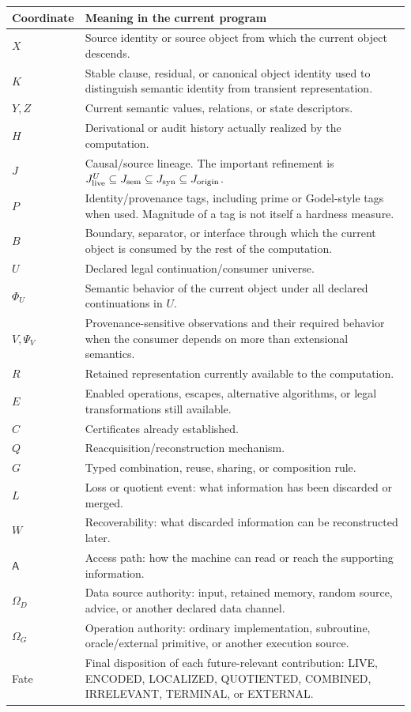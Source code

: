 \documentclass[11pt]{article}
\theoremstyle{plain}
\theoremstyle{definition}
\theoremstyle{remark}
\begin{document}
\begin{longtable}{p{} p{}}
\toprule
\textbf{Coordinate} & \textbf{Meaning in the current program}\\
\midrule
\endhead
$X$ & Source identity or source object from which the current object descends.\\
$K$ & Stable clause, residual, or canonical object identity used to distinguish
semantic identity from transient representation.\\
$Y,Z$ & Current semantic values, relations, or state descriptors.\\
$H$ & Derivational or audit history actually realized by the computation.\\
$J$ & Causal/source lineage. The important refinement is
$J_{\rm live}^U\subseteq J_{\rm sem}\subseteq J_{\rm syn}\subseteq J_{\rm origin}$.\\
$P$ & Identity/provenance tags, including prime or Godel-style tags when used.
Magnitude of a tag is not itself a hardness measure.\\
$B$ & Boundary, separator, or interface through which the current object is
consumed by the rest of the computation.\\
$U$ & Declared legal continuation/consumer universe.\\
$\Phi_U$ & Semantic behavior of the current object under all declared
continuations in $U$.\\
$V,\Psi_V$ & Provenance-sensitive observations and their required behavior when
the consumer depends on more than extensional semantics.\\
$R$ & Retained representation currently available to the computation.\\
$E$ & Enabled operations, escapes, alternative algorithms, or legal
transformations still available.\\
$C$ & Certificates already established.\\
$Q$ & Reacquisition/reconstruction mechanism.\\
$G$ & Typed combination, reuse, sharing, or composition rule.\\
$L$ & Loss or quotient event: what information has been discarded or merged.\\
$W$ & Recoverability: what discarded information can be reconstructed later.\\
$\mathsf A$ & Access path: how the machine can read or reach the supporting
information.\\
$\Omega_D$ & Data source authority: input, retained memory, random source,
advice, or another declared data channel.\\
$\Omega_G$ & Operation authority: ordinary implementation, subroutine,
oracle/external primitive, or another execution source.\\
Fate & Final disposition of each future-relevant contribution:
LIVE, ENCODED, LOCALIZED, QUOTIENTED, COMBINED, IRRELEVANT, TERMINAL, or EXTERNAL.\\
\bottomrule
\end{longtable}
\end{document}
